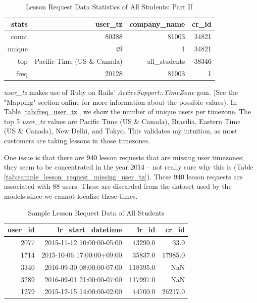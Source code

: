 \documentclass[oneside]{article}
\begin{document}
\begin{table}[]
  \centering
  \caption{Lesson Request Data Statistics of All Students: Part II}
  \label{tab:summary_stats_all_students_part_2}
  \begin{tabular}{rrrr}
    \hline
    \textbf{stats} & \textbf{user\_tz} & \textbf{company\_name} & \textbf{cr\_id} \\
    \hline
    count   &   80388    & 81003    & 34821 \\
    unique  & 49    & 1    & 34821 \\
    top    & Pacific Time (US \& Canada)   & all\_students   & 38346 \\
    freq    & 20128    & 81003    & 1 \\
    \hline
  \end{tabular}
\end{table}

\emph{user\_tz} makes use of Ruby on Rails' \emph{ActiveSupport::TimeZone}
gem\cite{astz}.  (See the "Mapping" section online for more information about
the possible values). In Table \ref{tab:freq_user_tz}, we show the number of
unique users per timezone. The top 5 \emph{user\_tz} values are Pacific Time
(US \& Canada), Brasilia, Eastern Time (US \& Canada), New Delhi, and Tokyo.
This validates my intuition, as most customers are taking lessons in those
timezones.

One issue is that there are 940 lesson requests that are missing user
timezones; they seem to be concentrated in the year 2014 -- not really sure why
this is (Table \ref{tab:sample_lesson_request_missing_user_tz}). These 940
lesson requests are associated with 88 users. These are discarded from the
dataset used by the models since we cannot localize these times.


\begin{table}[]
  \centering
  \caption{Sample Lesson Request Data of All Students}
  \label{tab:sample_lesson_request_data}
  \begin{tabular}{rrrr}
    \hline
     \textbf{user\_id} & \textbf{lr\_start\_datetime} & \textbf{lr\_id} & \textbf{cr\_id} \\
    \hline
     2077 & 2015-11-12 10:00:00-05:00 & 43290.0 & 33.0\\
     1714 & 2015-10-06 17:00:00+09:00& 35837.0& 17985.0\\
     3340 & 2016-09-30 08:00:00-07:00& 118395.0 & NaN\\
     3289 & 2016-09-01 21:00:00-07:00& 117997.0 & NaN\\
     1279 & 2015-12-15 14:00:00-02:00& 44700.0& 26217.0\\
    \hline
  \end{tabular}
\end{table}
\end{document}
